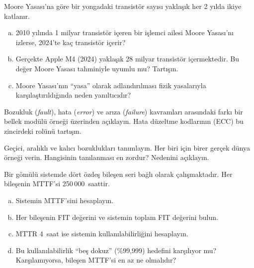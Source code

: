 \begin{alistirma}[\orta]
Moore Yasası'na göre bir yongadaki transistör sayısı yaklaşık her 2 yılda ikiye katlanır.
\begin{enumerate}[(a)]
    \item 2010 yılında 1 milyar transistör içeren bir işlemci ailesi Moore Yasası'nı izlerse, 2024'te kaç transistör içerir?
    \item Gerçekte Apple M4 (2024) yaklaşık 28 milyar transistör içermektedir. Bu değer Moore Yasası tahminiyle uyumlu mu? Tartışın.
    \item Moore Yasası'nın ``yasa'' olarak adlandırılması fizik yasalarıyla karşılaştırıldığında neden yanıltıcıdır?
\end{enumerate}
\end{alistirma}


\begin{alistirma}[\orta]
Bozukluk (\emph{fault}), hata (\emph{error}) ve arıza (\emph{failure}) kavramları arasındaki farkı bir bellek modülü örneği üzerinden açıklayın. Hata düzeltme kodlarının (ECC) bu zincirdeki rolünü tartışın.
\end{alistirma}

\begin{alistirma}[\kolay]
Geçici, aralıklı ve kalıcı bozuklukları tanımlayın. Her biri için birer gerçek dünya örneği verin. Hangisinin tanılanması en zordur? Nedenini açıklayın.
\end{alistirma}

\begin{alistirma}[\zor]
Bir gömülü sistemde dört özdeş bileşen seri bağlı olarak çalışmaktadır. Her bileşenin MTTF'si 250\,000~saattir.
\begin{enumerate}[(a)]
    \item Sistemin MTTF'sini hesaplayın.
    \item Her bileşenin FIT değerini ve sistemin toplam FIT değerini bulun.
    \item MTTR 4~saat ise sistemin kullanılabilirliğini hesaplayın.
    \item Bu kullanılabilirlik ``beş dokuz'' (\%99,999) hedefini karşılıyor mu? Karşılamıyorsa, bileşen MTTF'si en az ne olmalıdır?
\end{enumerate}
\end{alistirma}

